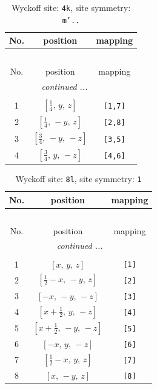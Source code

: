 \documentclass[fleqn,8pt]{jsarticle}
\begin{document}
\renewcommand{\arraystretch}{1.2}
\begin{longtable}{ccc}
\caption{Wyckoff site: {\tt 4k}, site symmetry: {\tt m'..}}
 \\
 \hline \hline
No. & position & mapping \\ \hline \endfirsthead

\multicolumn{2}{l}{\tablename\ \thetable{}} \\
 \hline \hline
No. & position & mapping \\ \hline \endhead

 \hline \hline
\multicolumn{2}{r}{\footnotesize\it continued ...} \\ \endfoot

 \hline \hline
\multicolumn{2}{r}{} \\ \endlastfoot

1 & $\left[ \frac{1}{4},\, y,\, z \right]$ & {\tt [1,7]} \\ \hline
2 & $\left[ \frac{1}{4},\, - y,\, z \right]$ & {\tt [2,8]} \\ \hline
3 & $\left[ \frac{3}{4},\, - y,\, - z \right]$ & {\tt [3,5]} \\ \hline
4 & $\left[ \frac{3}{4},\, y,\, - z \right]$ & {\tt [4,6]} \\
\end{longtable}
\renewcommand{\arraystretch}{1.2}
\begin{longtable}{ccc}
\caption{Wyckoff site: {\tt 8l}, site symmetry: {\tt 1}}
 \\
 \hline \hline
No. & position & mapping \\ \hline \endfirsthead

\multicolumn{2}{l}{\tablename\ \thetable{}} \\
 \hline \hline
No. & position & mapping \\ \hline \endhead

 \hline \hline
\multicolumn{2}{r}{\footnotesize\it continued ...} \\ \endfoot

 \hline \hline
\multicolumn{2}{r}{} \\ \endlastfoot

1 & $\left[ x,\, y,\, z \right]$ & {\tt [1]} \\ \hline
2 & $\left[ \frac{1}{2} - x,\, - y,\, z \right]$ & {\tt [2]} \\ \hline
3 & $\left[ - x,\, - y,\, - z \right]$ & {\tt [3]} \\ \hline
4 & $\left[ x + \frac{1}{2},\, y,\, - z \right]$ & {\tt [4]} \\ \hline
5 & $\left[ x + \frac{1}{2},\, - y,\, - z \right]$ & {\tt [5]} \\ \hline
6 & $\left[ - x,\, y,\, - z \right]$ & {\tt [6]} \\ \hline
7 & $\left[ \frac{1}{2} - x,\, y,\, z \right]$ & {\tt [7]} \\ \hline
8 & $\left[ x,\, - y,\, z \right]$ & {\tt [8]} \\
\end{longtable}
\end{document}
